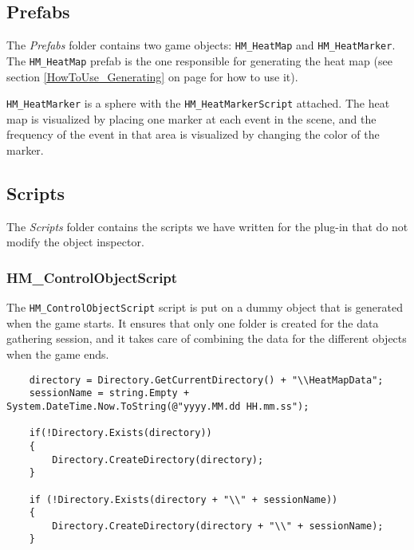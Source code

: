 \subsection{Prefabs}
\label{Overview_Folder_Prefabs}

The \textit{Prefabs} folder contains two game objects: \texttt{HM\_HeatMap} and \texttt{HM\_HeatMarker}. The \texttt{HM\_HeatMap} prefab is the one responsible for generating the heat map (see section \ref{HowToUse_Generating} on page \pageref{HowToUse_Generating} for how to use it).

\texttt{HM\_HeatMarker} is a sphere with the \texttt{HM\_HeatMarkerScript} attached. The heat map is visualized by placing one marker at each event in the scene, and the frequency of the event in that area is visualized by changing the color of the marker.

\subsection{Scripts}
\label{Overview_Folder_Scripts}

The \textit{Scripts} folder contains the scripts we have written for the plug-in that do not modify the object inspector.

\subsubsection*{HM\_ControlObjectScript}

The \texttt{HM\_ControlObjectScript} script is put on a dummy object that is generated when the game starts. It ensures that only one folder is created for the data gathering session, and it takes care of combining the data for the different objects when the game ends.

\begin{lstlisting}
	directory = Directory.GetCurrentDirectory() + "\\HeatMapData";
	sessionName = string.Empty + System.DateTime.Now.ToString(@"yyyy.MM.dd HH.mm.ss");
				
	if(!Directory.Exists(directory))
	{
		Directory.CreateDirectory(directory);
	}
	
	if (!Directory.Exists(directory + "\\" + sessionName))
	{
		Directory.CreateDirectory(directory + "\\" + sessionName);
	}
\end{lstlisting}

